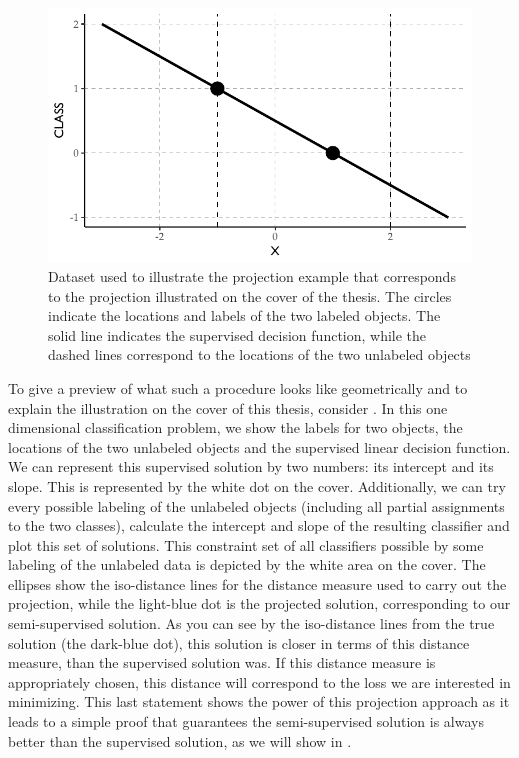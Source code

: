 \documentclass[twoside]{memoir}\usepackage[]{graphicx}\usepackage{xcolor}
\makeatletter
\def\maxwidth{ %
  \ifdim\Gin@nat@width>\linewidth
    \linewidth
  \else
    \Gin@nat@width
  \fi
}
\newenvironment{knitrout}{}{} %
\makeatother
\begin{document}
\begin{knitrout}
\color{fgcolor}\begin{figure}
\includegraphics[width=\maxwidth]{figure/coverexample-1} \caption[Dataset used to illustrate the projection example that corresponds to the projection illustrated on the cover of the thesis]{Dataset used to illustrate the projection example that corresponds to the projection illustrated on the cover of the thesis. The circles indicate the locations and labels of the two labeled objects. The solid line indicates the supervised decision function, while the dashed lines correspond to the locations of the two unlabeled objects}\label{fig:coverexample}
\end{figure}


\end{knitrout}
To give a preview of what such a procedure looks like geometrically and to explain the illustration on the cover of this thesis, consider . In this one dimensional classification problem, we show  the labels for two objects, the locations of the two unlabeled objects and the supervised linear decision function. We can represent this supervised solution by two numbers: its intercept and its slope. This is represented by the white dot on the cover. Additionally, we can try every possible labeling of the unlabeled objects (including all partial assignments to the two classes), calculate the intercept and slope of the resulting classifier and plot this set of solutions. This constraint set of all classifiers possible by some labeling of the unlabeled data is depicted by the white area on the cover. The ellipses show the iso-distance lines for the distance measure used to carry out the projection, while the light-blue dot is the projected solution, corresponding to our semi-supervised solution. As you can see by the iso-distance lines from the true solution (the dark-blue dot), this solution is closer in terms of this distance measure, than the supervised solution was. If this distance measure is appropriately chosen, this distance will correspond to the loss we are interested in minimizing.
This last statement shows the power of this projection approach as it leads to a simple proof that guarantees the semi-supervised solution is always better than the supervised solution, as we will show in .
\end{document}
